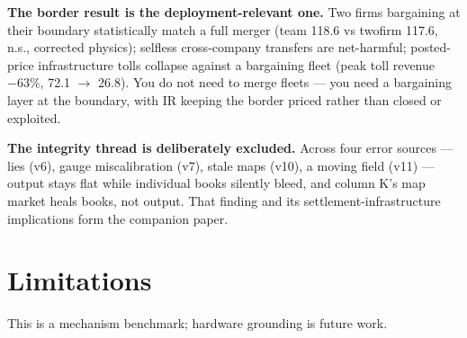 \documentclass[sigconf,nonacm]{acmart}
\begin{document}
\textbf{The border result is the deployment-relevant one.} Two firms
bargaining at their boundary statistically match a full merger (team 118.6
vs twofirm 117.6, n.s., corrected physics); selfless cross-company
transfers are net-harmful; posted-price infrastructure tolls collapse
against a bargaining fleet (peak toll revenue $-63\%$, 72.1 $\to$ 26.8).
You do not need to merge fleets --- you need a bargaining layer at the
boundary, with IR keeping the border priced rather than closed or
exploited.

\textbf{The integrity thread is deliberately excluded.} Across four error
sources --- lies (v6), gauge miscalibration (v7), stale maps (v10), a
moving field (v11) --- output stays flat while individual books silently
bleed, and column K's map market heals books, not output. That finding and
its settlement-infrastructure implications form the companion paper.

\section{Limitations}\label{sec:limitations}

This is a mechanism benchmark; hardware grounding is future work.
\end{document}
